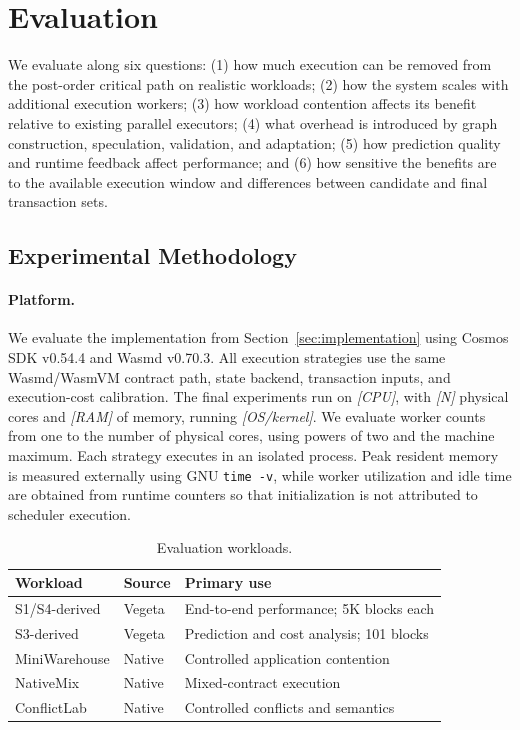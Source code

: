 
\section{Evaluation}
\label{sec:evaluation}

We evaluate \system along six questions: (1) how much execution can be removed from the post-order critical path on realistic workloads; (2) how the system scales with additional execution workers; (3) how workload contention affects its benefit relative to existing parallel executors; (4) what overhead is introduced by graph construction, speculation, validation, and adaptation; (5) how prediction quality and runtime feedback affect performance; and (6) how sensitive the benefits are to the available execution window and differences between candidate and final transaction sets.

\subsection{Experimental Methodology}

\paragraph{Platform.}
We evaluate the implementation from Section~\ref{sec:implementation} using Cosmos SDK v0.54.4 and Wasmd v0.70.3. All execution strategies use the same Wasmd/WasmVM contract path, state backend, transaction inputs, and execution-cost calibration. The final experiments run on \emph{[CPU]}, with \emph{[N]} physical cores and \emph{[RAM]} of memory, running \emph{[OS/kernel]}. We evaluate worker counts from one to the number of physical cores, using powers of two and the machine maximum. Each strategy executes in an isolated process. Peak resident memory is measured externally using GNU \texttt{time -v}, while worker utilization and idle time are obtained from runtime counters so that initialization is not attributed to scheduler execution.

\begin{table}[t]
\centering
\caption{Evaluation workloads.}
\label{tab:workloads}
\footnotesize
\setlength{\tabcolsep}{3pt}
\begin{tabularx}{\columnwidth}{@{}llX@{}}
\toprule
\textbf{Workload} & \textbf{Source} & \textbf{Primary use} \\
\midrule
S1/S4-derived & Vegeta & End-to-end performance; 5K blocks each \\
S3-derived & Vegeta & Prediction and cost analysis; 101 blocks \\
MiniWarehouse & Native & Controlled application contention \\
NativeMix & Native & Mixed-contract execution \\
ConflictLab & Native & Controlled conflicts and semantics \\
\bottomrule
\end{tabularx}
\end{table}

